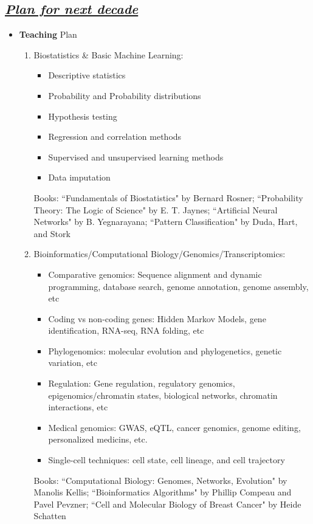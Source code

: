 \documentclass{res}
\begin{document}
\begin{resume}
\section{\sl \underline{Plan for next decade}}
\begin{itemize}
\item {\bf Teaching} Plan 
\begin{enumerate}
\item Biostatistics \& Basic Machine Learning: 
    \begin{itemize}
        \item Descriptive statistics
        \item Probability and Probability distributions
        \item Hypothesis testing
        \item Regression and correlation methods 
        \item Supervised and unsupervised learning methods 
        \item Data imputation
    \end{itemize} 
Books: ``Fundamentals of Biostatistics" by Bernard Rosner; ``Probability Theory: The Logic of Science" by E. T. Jaynes; ``Artificial Neural  Networks" by B. Yegnarayana; ``Pattern Classification" by Duda, Hart, and Stork
\item Bioinformatics/Computational Biology/Genomics/Transcriptomics: 
    \begin{itemize}
        \item Comparative genomics: Sequence alignment and dynamic programming, database search, genome annotation, genome assembly, etc 
        \item Coding vs non-coding genes: Hidden Markov Models, gene identification, RNA-seq, RNA folding, etc 
        \item Phylogenomics: molecular evolution and phylogenetics, genetic variation, etc 
        \item Regulation: Gene regulation, regulatory genomics, epigenomics/chromatin states, biological networks, chromatin interactions, etc  
        \item Medical genomics: GWAS, eQTL, cancer genomics, genome editing, personalized medicins, etc.  
        \item Single-cell techniques:  cell state, cell lineage, and cell trajectory 
    \end{itemize}
Books: ``Computational Biology: Genomes, Networks, Evolution" by Manolis Kellis; ``Bioinformatics Algorithms" by Phillip Compeau and Pavel Pevzner; ``Cell and Molecular Biology of Breast Cancer" by  Heide Schatten

\end{enumerate}
\end{itemize}
\end{resume}
\end{document}

